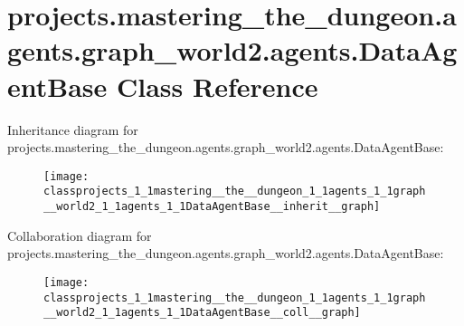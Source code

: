 \hypertarget{classprojects_1_1mastering__the__dungeon_1_1agents_1_1graph__world2_1_1agents_1_1DataAgentBase}{}\section{projects.\+mastering\+\_\+the\+\_\+dungeon.\+agents.\+graph\+\_\+world2.\+agents.\+Data\+Agent\+Base Class Reference}
\label{classprojects_1_1mastering__the__dungeon_1_1agents_1_1graph__world2_1_1agents_1_1DataAgentBase}


Inheritance diagram for projects.\+mastering\+\_\+the\+\_\+dungeon.\+agents.\+graph\+\_\+world2.\+agents.\+Data\+Agent\+Base\+:
\nopagebreak
\begin{figure}[H]
\begin{center}
\leavevmode
\texttt{[image: classprojects\_1\_1mastering\_\_the\_\_dungeon\_1\_1agents\_1\_1graph\_\_world2\_1\_1agents\_1\_1DataAgentBase\_\_inherit\_\_graph]}
\end{center}
\end{figure}


Collaboration diagram for projects.\+mastering\+\_\+the\+\_\+dungeon.\+agents.\+graph\+\_\+world2.\+agents.\+Data\+Agent\+Base\+:
\nopagebreak
\begin{figure}[H]
\begin{center}
\leavevmode
\texttt{[image: classprojects\_1\_1mastering\_\_the\_\_dungeon\_1\_1agents\_1\_1graph\_\_world2\_1\_1agents\_1\_1DataAgentBase\_\_coll\_\_graph]}
\end{center}
\end{figure}
